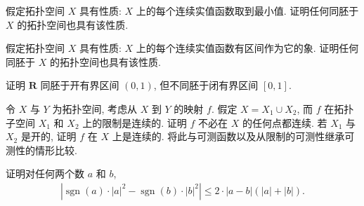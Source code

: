 \documentclass[../../main.tex]{subfiles}
\begin{document}
\begin{exercise}\label{exercise:ch11-34}
假定拓扑空间 $X$ 具有性质: $X$ 上的每个连续实值函数取到最小值. 证明任何同胚于 $X$ 的拓扑空间也具有该性质.
\end{exercise}

\begin{exercise}\label{exercise:ch11-35}
假定拓扑空间 $X$ 具有性质: $X$ 上的每个连续实值函数有区间作为它的象. 证明任何同胚于 $X$ 的拓扑空间也具有该性质.
\end{exercise}

\begin{exercise}\label{exercise:ch11-36}
证明 $\mathbf{R}$ 同胚于开有界区间 $(0,1)$, 但不同胚于闭有界区间 $[0,1]$.
\end{exercise}

\begin{exercise}\label{exercise:ch11-37}
令 $X$ 与 $Y$ 为拓扑空间, 考虑从 $X$ 到 $Y$ 的映射 $f$. 假定 $X=X_{1}\cup X_{2}$, 而 $f$ 在拓扑子空间 $X_{1}$ 和 $X_{2}$ 上的限制是连续的. 证明 $f$ 不必在 $X$ 的任何点都连续. 若 $X_{1}$ 与 $X_{2}$ 是开的, 证明 $f$ 在 $X$ 上是连续的. 将此与可测函数以及从限制的可测性继承可测性的情形比较.
\end{exercise}

\begin{exercise}\label{exercise:ch11-38}
证明对任何两个数 $a$ 和 $b$,
\begin{align*}
\left|\operatorname{sgn}(a)\cdot|a|^{2}-\operatorname{sgn}(b)\cdot|b|^{2}\right|\leqslant 2\cdot|a-b|(|a|+|b|).
\end{align*}
\end{exercise}
\end{document}
